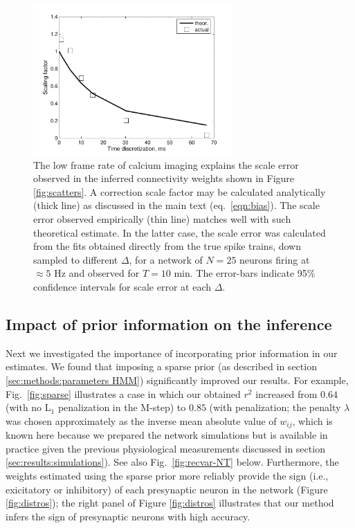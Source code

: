 \documentclass[aoas,preprint]{imsart}
\begin{document}
\begin{figure}[t!]
\centering
\includegraphics[width=3in]{../figs/FigureA4_scale_bias}
\caption{The low frame rate of calcium imaging explains the scale
error observed in the inferred connectivity weights shown in Figure
\ref{fig:scatters}.  A correction scale factor may be calculated
analytically (thick line) as discussed in the main text
(eq.~\ref{eqn:bias}).  The scale error observed empirically (thin
line) matches well with such theoretical estimate. In the latter case,
the scale error was calculated from the fits obtained directly from
the true spike trains, down sampled to different $\Delta$, for a
network of $N=25$ neurons firing at $\approx 5$ Hz and observed for
$T=10$ min. The error-bars indicate 95\% confidence intervals for
scale error at each $\Delta$.}
\label{fig:bias}
\end{figure}

\subsection{Impact of prior information on the inference}

Next we investigated the importance of incorporating prior information
in our estimates.  We found that imposing a sparse prior (as described
in section \ref{sec:methods:parameters HMM}) significantly improved
our results.  For example, Fig.~\ref{fig:sparse} illustrates a case in
which our obtained $r^2$ increased from $0.64$ (with no L$_1$
penalization in the M-step) to $0.85$ (with penalization; the penalty
$\lambda$ was chosen approximately as the inverse mean absolute value
of $w_{ij}$, which is known here because we prepared the network
simulations but is available in practice given the previous
physiological measurements discussed in section
\ref{sec:results:simulations}).  See also Fig.~\ref{fig:recvar-NT}
below.  Furthermore, the weights estimated using the sparse prior more
reliably provide the sign (i.e., exicitatory or inhibitory) of each
presynaptic neuron in the network (Figure \ref{fig:distros}); the
right panel of Figure \ref{fig:distros} illustrates that our method
infers the sign of presynaptic neurons with high accuracy.
\end{document}

